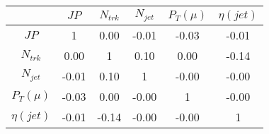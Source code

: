 \begin{tabular}{|c|c|c|c|c|c|} 
\hline
 & $JP$ & $N_{trk}$ & $N_{jet}$ & $P_{T} (\mu)$ & $\eta (jet)$ \\ \hline
$JP$ & 1 & 0.00 & -0.01 & -0.03 & -0.01 \\
$N_{trk}$ & 0.00 & 1 & 0.10 & 0.00 & -0.14 \\
$N_{jet}$ & -0.01 & 0.10 & 1 & -0.00 & -0.00 \\
$P_{T} (\mu)$ & -0.03 & 0.00 & -0.00 & 1 & -0.00 \\
$\eta (jet)$ & -0.01 & -0.14 & -0.00 & -0.00 & 1 \\
\hline 
\end{tabular} 


